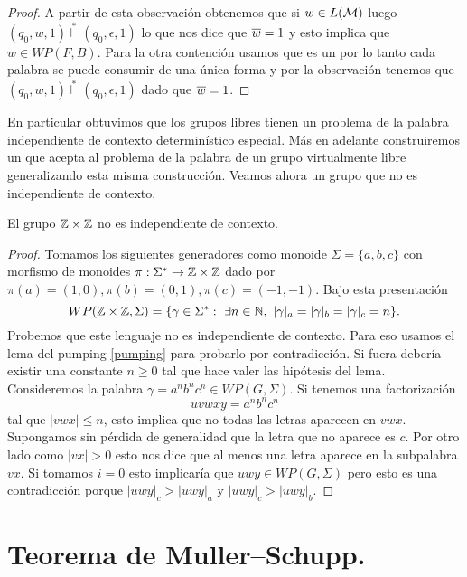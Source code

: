 \documentclass[tesis.tex]{subfiles}
\begin{document}
\begin{proof}
	
	A partir de esta observación obtenemos que si $w \in L(\cal M)$ luego 
	$(q_{0},w,1) \overset{*}{\vdash} (q_{0},\epsilon,1)$ lo que nos dice que $\overline w = 1$ y esto implica que $w \in WP(F, B)$.
	Para la otra contención usamos que es un \APD por lo tanto cada palabra se puede consumir de una única forma y por la observación tenemos que $(q_{0},w,1) \overset{*}{\vdash} (q_{0},\epsilon,1)$ dado que $\overline w = 1$.
\end{proof}

En particular obtuvimos que los grupos libres tienen un problema de la palabra independiente de contexto determinístico especial.
Más en adelante construiremos un \APD que acepta al problema de la palabra de un grupo virtualmente libre generalizando esta misma construcción.
Veamos ahora un grupo que no es independiente de contexto.

\begin{prop}
	El grupo $\mathbb{Z} \times \mathbb{Z}$ no es independiente de contexto.
\end{prop}

\begin{proof}
	Tomamos los siguientes generadores como monoide $\Sigma = \{ a,b,c \}$ con morfismo de monoides $\pi: \Sigma^* \to \mathbb{Z} \times \mathbb{Z}$ dado por $\pi(a)=(1,0), \pi(b)=(0,1), \pi(c)=(-1,-1)$.
	Bajo esta presentación 
	\[
	WP(\mathbb{Z} \times \mathbb{Z}, \Sigma) = \{ \gamma \in \Sigma^*  : \ \exists n \in \mathbb{N}, \ |\gamma|_a = |\gamma|_b = |\gamma|_c = n \}.
	\]
	Probemos que este lenguaje no es independiente de contexto.
	Para eso usamos el lema del pumping \ref{pumping} para probarlo por contradicción.
	Si fuera \ic debería existir una constante $n \ge 0$ tal que hace valer las hipótesis del lema.
	Consideremos la palabra $\gamma = a^n b^n c^n \in WP(G, \Sigma)$.
	Si tenemos una factorización 
	\[
	uvwxy = a^nb^nc^n
	\]
	tal que $|vwx| \le n$, esto implica que no todas las letras aparecen en $vwx$.
	Supongamos sin pérdida de generalidad que la letra que no aparece es $c$.
	Por otro lado como $|vx| > 0$ esto nos dice que al menos una letra aparece en la subpalabra $vx$.
	Si tomamos $i=0$ esto implicaría que $uwy \in WP(G,\Sigma)$ pero esto es una contradicción porque $|uwy|_{c} > |uwy|_{a}$ y $|uwy|_{c} > |uwy|_{b}$.
\end{proof}
 





\section{Teorema de Muller--Schupp.}\label{secc_teo_MS}
\end{document}
